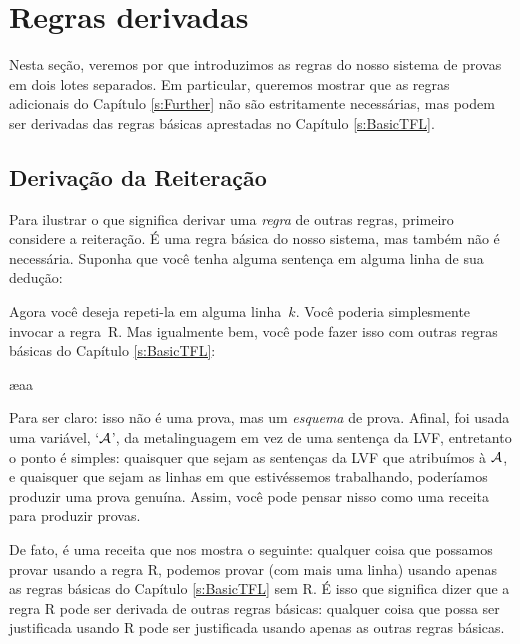 
\chapter{Regras derivadas}\label{s:Derived}
Nesta se\c c\~ao, veremos por que introduzimos as regras do nosso sistema de provas em dois lotes separados. Em particular, queremos mostrar que as regras adicionais do Capítulo \ref{s:Further} n\~ao s\~ao estritamente necess\'arias, mas podem ser derivadas das regras b\'asicas aprestadas no Capítulo \ref{s:BasicTFL}. 

\section{Deriva\c c\~ao da Reitera\c c\~ao}
Para ilustrar o que significa derivar uma   \emph{regra} de outras regras, primeiro considere a reitera\c c\~ao. \'E uma regra b\'asica do nosso sistema, mas tamb\'em n\~ao \'e necess\'aria. Suponha que voc\^e tenha alguma senten\c ca em alguma linha de sua dedu\c c\~ao:
\begin{fitchproof}
\end{fitchproof}
Agora voc\^e deseja repeti-la em alguma linha~$k$. Voc\^e poderia simplesmente invocar a regra~R. Mas igualmente bem, voc\^e pode fazer isso com outras regras b\'asicas do Capítulo \ref{s:BasicTFL}:
\begin{fitchproof}
	\ae{aa}
\end{fitchproof}


Para ser claro: isso n\~ao \'e uma prova, mas um \emph{esquema} de prova. Afinal, foi usada  uma vari\'avel, `$\mathcal{A}$', da metalinguagem  em vez de uma senten\c ca da LVF, entretanto o ponto \'e simples: quaisquer que sejam as senten\c cas da LVF que atribu\'imos \`a $\mathcal{A}$, e quaisquer que sejam as linhas em que estiv\'essemos trabalhando, poder\'iamos produzir uma  prova genu\'ina. Assim, voc\^e pode pensar nisso como uma receita para produzir provas.

De fato, \'e uma receita que nos mostra o seguinte: qualquer coisa que possamos provar usando a regra R, podemos provar (com mais uma linha) usando apenas as regras b\'asicas do Capítulo \ref{s:BasicTFL} sem R. \'E isso que significa dizer que a regra R pode ser derivada de outras regras b\'asicas: qualquer coisa que possa ser justificada usando R pode ser justificada usando apenas as outras regras b\'asicas.

